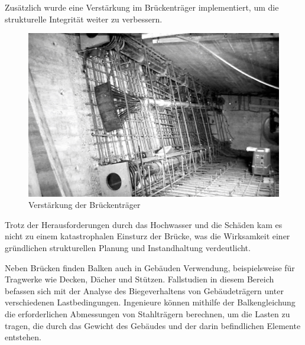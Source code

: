 {Zusätzlich wurde eine Verstärkung im Brückenträger implementiert, um die strukturelle Integrität weiter zu verbessern. 
\begin{figure}
\begin{center}
\includegraphics[width=\textwidth]{papers/balken/images/teil3/ReussbrueckeWassen3.jpg}
\end{center}
\caption{Verstärkung der Brückenträger}
\end{figure}
Trotz der Herausforderungen durch das Hochwasser und die Schäden kam es nicht zu einem katastrophalen Einsturz der Brücke, was die Wirksamkeit einer gründlichen strukturellen Planung und Instandhaltung verdeutlicht.

Neben Brücken finden Balken auch in Gebäuden Verwendung, beispielsweise für Tragwerke wie Decken, Dächer und Stützen.
Fallstudien in diesem Bereich befassen sich mit der Analyse des Biegeverhaltens von Gebäudeträgern unter verschiedenen Lastbedingungen. Ingenieure können mithilfe der Balkengleichung die erforderlichen Abmessungen von Stahlträgern berechnen, um die Lasten zu tragen, die durch das Gewicht des Gebäudes und der darin befindlichen Elemente entstehen.

}
